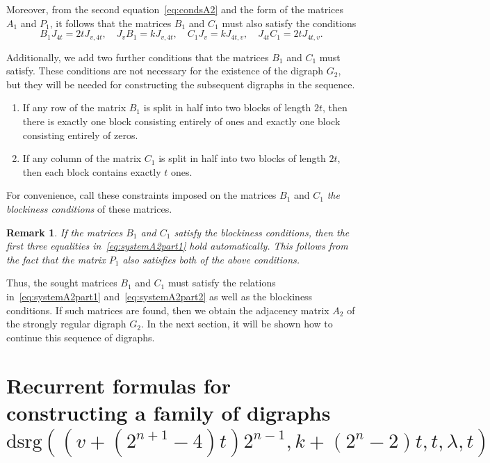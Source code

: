 \documentclass{article}
\newtheorem*{remark}{Remark}
\begin{document}
Moreover, from the second equation~\eqref{eq:condsA2} and the form of the matrices $A_1$ and $P_1$, it follows that the matrices $B_1$ and $C_1$ must also satisfy the conditions
\begin{equation}
\label{eq:systemA2part2}
B_1 J_{4t} = 2tJ_{v, 4t}, \quad J_v B_1 = kJ_{v, 4t}, \quad C_1 J_{v} = kJ_{4t, v}, \quad J_{4t} C_1 = 2tJ_{4t, v}.
\end{equation}

Additionally, we add two further conditions that the matrices $B_1$ and $C_1$ must satisfy. These conditions are not necessary for the existence of the digraph $G_2$, but they will be needed for constructing the subsequent digraphs in the sequence.

\begin{enumerate}
\item If any row of the matrix $B_1$ is split in half into two blocks of length $2t$, then there is exactly one block consisting entirely of ones and exactly one block consisting entirely of zeros.
\item If any column of the matrix $C_1$ is split in half into two blocks of length $2t$, then each block contains exactly $t$ ones.
\end{enumerate}

For convenience, call these constraints imposed on the matrices $B_1$ and $C_1$ \textit{the blockiness conditions} of these matrices.

\begin{remark}
If the matrices $B_1$ and $C_1$ satisfy the blockiness conditions, then the first three equalities in~\eqref{eq:systemA2part1} hold automatically. This follows from the fact that the matrix $P_1$ also satisfies both of the above conditions.
\end{remark}

Thus, the sought matrices $B_1$ and $C_1$ must satisfy the relations in~\eqref{eq:systemA2part1} and~\eqref{eq:systemA2part2} as well as the blockiness conditions. If such matrices are found, then we obtain the adjacency matrix $A_2$ of the strongly regular digraph $G_2$. In the next section, it will be shown how to continue this sequence of digraphs.

\section{Recurrent formulas for constructing a family of digraphs $\text{dsrg}((v+(2^{n+1}-4)t)2^{n-1}, k+(2^n-2)t, t, \lambda, t)$}
\label{sec2}
\end{document}
